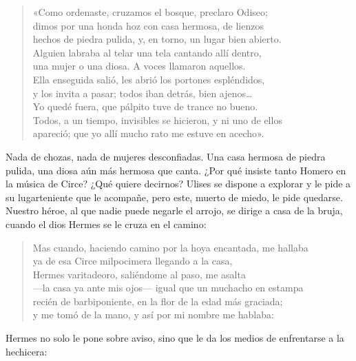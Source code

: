 \begin{verse}
«Como ordenaste, cruzamos el bosque, preclaro Odiseo;\\
dimos por una honda hoz con casa hermosa, de lienzos\\
hechos de piedra pulida, y, en torno, un lugar bien abierto.\\
Alguien labraba al telar una tela cantando allí dentro,\\
una mujer o una diosa. A voces llamaron aquellos.\\
Ella enseguida salió, les abrió los portones espléndidos,\\
y los invita a pasar; todos iban detrás, bien ajenos…\\
Yo quedé fuera, que pálpito tuve de trance no bueno.\\
Todos, a un tiempo, invisibles se hicieron, y ni uno de ellos\\
apareció; que yo allí mucho rato me estuve en acecho».
\end{verse}

Nada de chozas, nada de mujeres desconfiadas. Una casa hermosa de piedra pulida, una diosa aún más hermosa que canta. ¿Por qué insiste tanto Homero en la música de Circe? ¿Qué quiere decirnos? Ulises se dispone a explorar y le pide a su lugarteniente que le acompañe, pero este, muerto de miedo, le pide quedarse. Nuestro héroe, al que nadie puede negarle el arrojo, se dirige a casa de la bruja, cuando el dios Hermes se le cruza en el camino:

\begin{verse}
Mas cuando, haciendo camino por la hoya encantada, me hallaba\\
ya de esa Circe milpocimera llegando a la casa,\\
Hermes varitadeoro, saliéndome al paso, me asalta\\
---la casa ya ante mis ojos--- igual que un muchacho en estampa\\
recién de barbiponiente, en la flor de la edad más graciada;\\
y me tomó de la mano, y así por mi nombre me hablaba:
\end{verse}

Hermes no solo le pone sobre aviso, sino que le da los medios de enfrentarse a la hechicera:

